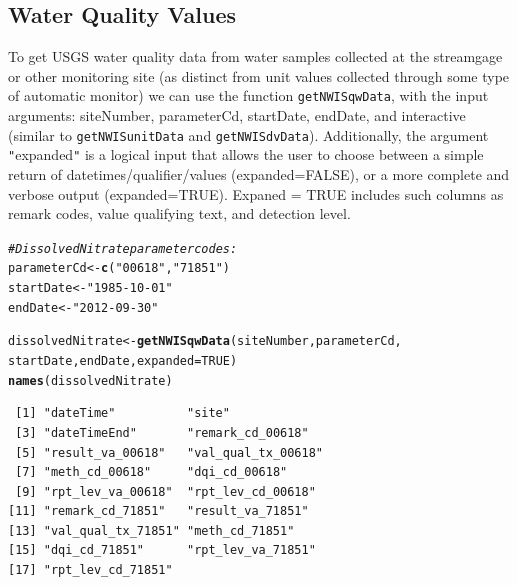 \documentclass[a4paper,11pt]{article}\usepackage[]{graphicx}\usepackage[]{color}
\makeatletter
\newcommand{\hlnum}[1]{\textcolor[rgb]{0.686,0.059,0.569}{#1}}%
\newcommand{\hlstr}[1]{\textcolor[rgb]{0.192,0.494,0.8}{#1}}%
\newcommand{\hlcom}[1]{\textcolor[rgb]{0.678,0.584,0.686}{\textit{#1}}}%
\newcommand{\hlstd}[1]{\textcolor[rgb]{0.345,0.345,0.345}{#1}}%
\newcommand{\hlkwb}[1]{\textcolor[rgb]{0.69,0.353,0.396}{#1}}%
\newcommand{\hlkwc}[1]{\textcolor[rgb]{0.333,0.667,0.333}{#1}}%
\newcommand{\hlkwd}[1]{\textcolor[rgb]{0.737,0.353,0.396}{\textbf{#1}}}%
\newenvironment{kframe}{%
 \def\at@end@of@kframe{}%
 \ifinner\ifhmode%
  \def\at@end@of@kframe{\end{minipage}}%
  \begin{minipage}{\columnwidth}%
 \fi\fi%
 \def\FrameCommand##1{\hskip\@totalleftmargin \hskip-\fboxsep
 \colorbox{shadecolor}{##1}\hskip-\fboxsep
     \hskip-\linewidth \hskip-\@totalleftmargin \hskip\columnwidth}%
 \MakeFramed {\advance\hsize-\width
   \@totalleftmargin\z@ \linewidth\hsize
   \@setminipage}}%
 {\par\unskip\endMakeFramed%
 \at@end@of@kframe}
\newenvironment{knitrout}{}{} %
\makeatother
\begin{document}
\subsection{Water Quality Values}
\label{sec:usgsWQP}
To get USGS water quality data from water samples collected at the streamgage or other monitoring site (as distinct from unit values collected through some type of automatic monitor) we can use the function \texttt{getNWISqwData}, with the input arguments: siteNumber, parameterCd, startDate, endDate, and interactive (similar to \texttt{getNWISunitData} and \texttt{getNWISdvData}). Additionally, the argument \texttt{"}expanded\texttt{"} is a logical input that allows the user to choose between a simple return of datetimes/qualifier/values (expanded=FALSE), or a more complete and verbose output (expanded=TRUE). Expaned = TRUE includes such columns as remark codes, value qualifying text, and detection level.


\begin{knitrout}
\color{fgcolor}\begin{kframe}
\begin{alltt}
\hlcom{# Dissolved Nitrate parameter codes:}
\hlstd{parameterCd} \hlkwb{<-} \hlkwd{c}\hlstd{(}\hlstr{"00618"}\hlstd{,}\hlstr{"71851"}\hlstd{)}
\hlstd{startDate} \hlkwb{<-} \hlstr{"1985-10-01"}
\hlstd{endDate} \hlkwb{<-} \hlstr{"2012-09-30"}

\hlstd{dissolvedNitrate} \hlkwb{<-} \hlkwd{getNWISqwData}\hlstd{(siteNumber, parameterCd,}
      \hlstd{startDate, endDate,} \hlkwc{expanded}\hlstd{=}\hlnum{TRUE}\hlstd{)}
\hlkwd{names}\hlstd{(dissolvedNitrate)}
\end{alltt}
\begin{verbatim}
 [1] "dateTime"          "site"             
 [3] "dateTimeEnd"       "remark_cd_00618"  
 [5] "result_va_00618"   "val_qual_tx_00618"
 [7] "meth_cd_00618"     "dqi_cd_00618"     
 [9] "rpt_lev_va_00618"  "rpt_lev_cd_00618" 
[11] "remark_cd_71851"   "result_va_71851"  
[13] "val_qual_tx_71851" "meth_cd_71851"    
[15] "dqi_cd_71851"      "rpt_lev_va_71851" 
[17] "rpt_lev_cd_71851" 
\end{verbatim}
\end{kframe}
\end{knitrout}
\end{document}
